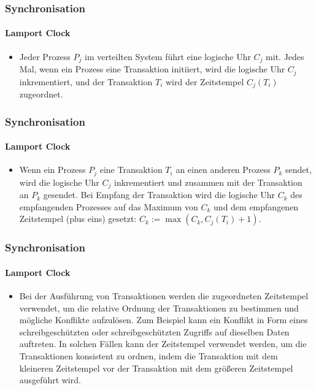 \begin{frame}
  \frametitle{Synchronisation}
  \framesubtitle{Lamport Clock}
  \begin{itemize}
  \item Jeder Prozess $P_j$ im verteilten System führt eine logische Uhr $C_j$ mit. Jedes Mal, wenn ein Prozess eine Transaktion initiiert, wird die logische Uhr $C_j$ inkrementiert, und der Transaktion $T_i$ wird der Zeitstempel $C_j(T_i)$ zugeordnet.
  \end{itemize}
\end{frame}

\begin{frame}
  \frametitle{Synchronisation}
  \framesubtitle{Lamport Clock}
  \begin{itemize}
  \item Wenn ein Prozess $P_j$ eine Transaktion $T_i$ an einen anderen Prozess $P_k$ sendet, wird die logische Uhr $C_j$ inkrementiert und zusammen mit der Transaktion an $P_k$ gesendet. Bei Empfang der Transaktion wird die logische Uhr $C_k$ des empfangenden Prozesses auf das Maximum von $C_k$ und dem empfangenen Zeitstempel (plus eins) gesetzt: $C_k := \max(C_k, C_j(T_i) + 1)$.
  \end{itemize}
\end{frame}

\begin{frame}
  \frametitle{Synchronisation}
  \framesubtitle{Lamport Clock}
  \begin{itemize}
  \item Bei der Ausführung von Transaktionen werden die zugeordneten Zeitstempel verwendet, um die relative Ordnung der Transaktionen zu bestimmen und mögliche Konflikte aufzulösen. Zum Beispiel kann ein Konflikt in Form eines schreibgeschützten oder schreibgeschützten Zugriffs auf dieselben Daten auftreten. In solchen Fällen kann der Zeitstempel verwendet werden, um die Transaktionen konsistent zu ordnen, indem die Transaktion mit dem kleineren Zeitstempel vor der Transaktion mit dem größeren Zeitstempel ausgeführt wird.
  \end{itemize}
\end{frame}



